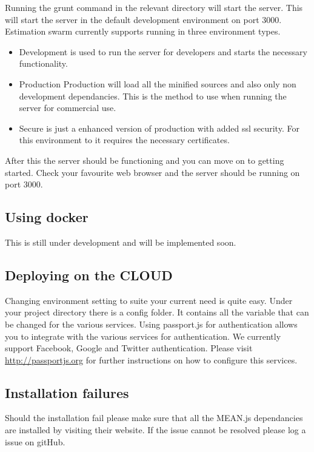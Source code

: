 \newline
Running the grunt command in the relevant directory will start the server. This will start the server in the default development environment on port 3000. Estimation swarm currently supports running in three environment types.
\begin{itemize}
	\item{Development} is used to run the server for developers and starts the necessary functionality.
	\item{Production}
	Production will load all the minified sources and also only non development dependancies. This is the method to use when running the server for commercial use.
	\item{Secure} is just a enhanced version of production with added ssl security. For this environment to it requires the necessary certificates.
\end{itemize}
After this the server should be functioning and you can move on to getting started. Check your favourite web browser and the server should be running on port 3000.
\subsection{Using docker}
This is still under development and will be implemented soon.
\subsection{Deploying on the CLOUD}
Changing environment setting to suite your current need is quite easy. Under your project directory there is a config folder. It contains all the variable that can be changed for the various services. Using passport.js for authentication allows you to integrate with the various services for authentication. We currently support Facebook, Google and Twitter authentication. Please visit \url{http://passportjs.org} for further instructions on how to configure this services.
\subsection{Installation failures}
Should the installation fail please make sure that all the MEAN.js dependancies are installed by visiting their website. If the issue cannot be resolved please log a issue on gitHub.